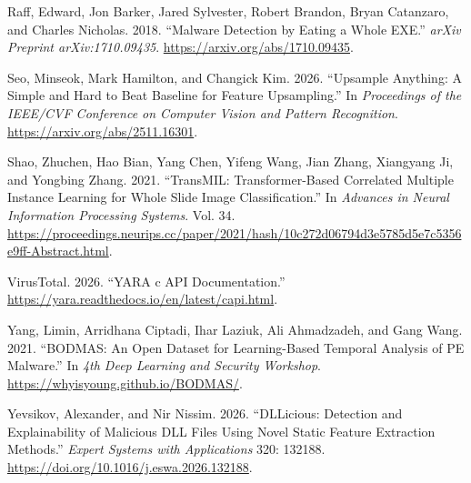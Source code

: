 \documentclass[
  10pt,
]{article}
\newlength{\cslhangindent}
\newenvironment{CSLReferences}[2] %
 {\begin{list}{}{%
  \setlength{\itemindent}{0pt}
  \setlength{\leftmargin}{0pt}
  \setlength{\parsep}{0pt}
  \ifodd #1
   \setlength{\leftmargin}{\cslhangindent}
   \setlength{\itemindent}{-1\cslhangindent}
  \fi
  \setlength{\itemsep}{#2\baselineskip}}}
 {\end{list}}
\begin{document}
\begin{CSLReferences}{1}{0}
Raff, Edward, Jon Barker, Jared Sylvester, Robert Brandon, Bryan
Catanzaro, and Charles Nicholas. 2018. {``Malware Detection by Eating a
Whole EXE.''} \emph{arXiv Preprint arXiv:1710.09435}.
\url{https://arxiv.org/abs/1710.09435}.

Seo, Minseok, Mark Hamilton, and Changick Kim. 2026. {``Upsample
Anything: A Simple and Hard to Beat Baseline for Feature Upsampling.''}
In \emph{Proceedings of the IEEE/CVF Conference on Computer Vision and
Pattern Recognition}. \url{https://arxiv.org/abs/2511.16301}.

Shao, Zhuchen, Hao Bian, Yang Chen, Yifeng Wang, Jian Zhang, Xiangyang
Ji, and Yongbing Zhang. 2021. {``{TransMIL}: Transformer-Based
Correlated Multiple Instance Learning for Whole Slide Image
Classification.''} In \emph{Advances in Neural Information Processing
Systems}. Vol. 34.
\url{https://proceedings.neurips.cc/paper/2021/hash/10c272d06794d3e5785d5e7c5356e9ff-Abstract.html}.

VirusTotal. 2026. {``YARA c API Documentation.''}
\url{https://yara.readthedocs.io/en/latest/capi.html}.

Yang, Limin, Arridhana Ciptadi, Ihar Laziuk, Ali Ahmadzadeh, and Gang
Wang. 2021. {``{BODMAS}: An Open Dataset for Learning-Based Temporal
Analysis of PE Malware.''} In \emph{4th Deep Learning and Security
Workshop}. \url{https://whyisyoung.github.io/BODMAS/}.

Yevsikov, Alexander, and Nir Nissim. 2026. {``{DLLicious}: Detection and
Explainability of Malicious DLL Files Using Novel Static Feature
Extraction Methods.''} \emph{Expert Systems with Applications} 320:
132188. \url{https://doi.org/10.1016/j.eswa.2026.132188}.

\end{CSLReferences}
\end{document}
